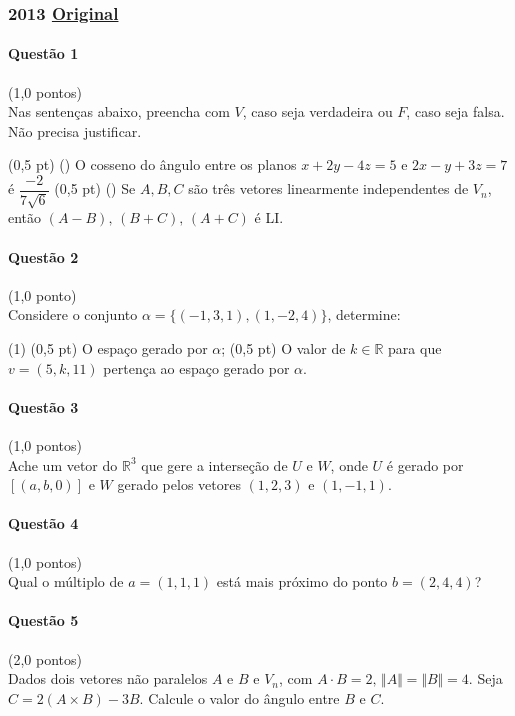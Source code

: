\documentclass[12pt,a4paper]{article}
\newcommand{\R}{\mathbb{R}}
\newcommand{\norm}[1]{\Vert #1 \Vert}
\newcommand{\original}[1]{\tiny \href{#1}{Original} \normalsize}
\begin{document}
\subsubsection{2013 \original{https://drive.google.com/file/d/1bwk1mAn79FwlUtRBnnPp72HRZ8yx1K2v/view?usp=sharing}}

\paragraph{Questão 1} (1,0 pontos)\\
Nas sentenças abaixo, preencha com $V$, caso seja verdadeira ou $F$, caso seja falsa. Não precisa justificar.
\begin{tasks}
\task (0,5 pt) (\quad) O cosseno do ângulo entre os planos $x+2y-4z = 5$ e $2x-y+3z=7$ é $\dfrac{-2}{7\sqrt{6}}$
\task (0,5 pt) (\quad) Se $A, B, C$ são três vetores linearmente independentes de $V_n$, então $(A-B),\, (B+C),\, (A+C)$ é LI.
\end{tasks}

\paragraph{Questão 2} (1,0 ponto)\\
Considere o conjunto $\alpha = \{ (-1, 3, 1), (1, -2, 4) \}$, determine:

\begin{tasks}(1)
\task (0,5 pt) O espaço gerado por $\alpha$;
\task (0,5 pt) O valor de $k\in \R$ para que $v=(5, k, 11)$ pertença ao espaço gerado por $\alpha$.
\end{tasks}

\paragraph{Questão 3} (1,0 pontos)\\
Ache um vetor do $\R^3$ que gere a interseção de $U$ e $W$, onde $U$ é gerado por $[ (a, b, 0) ]$ e $W$ gerado pelos vetores $(1,2,3)$ e $(1, -1, 1)$.

\paragraph{Questão 4} (1,0 pontos)\\
Qual o múltiplo de $a=(1,1,1)$ está mais próximo do ponto $b=(2,4,4)$?

\paragraph{Questão 5} (2,0 pontos)\\
Dados dois vetores não paralelos $A$ e $B$ e $V_n$, com $A\cdot B = 2,\, \norm{A} = \norm{B} = 4$. Seja $C = 2(A\times B) - 3B$. Calcule o valor do ângulo entre $B$ e $C$.
\end{document}

